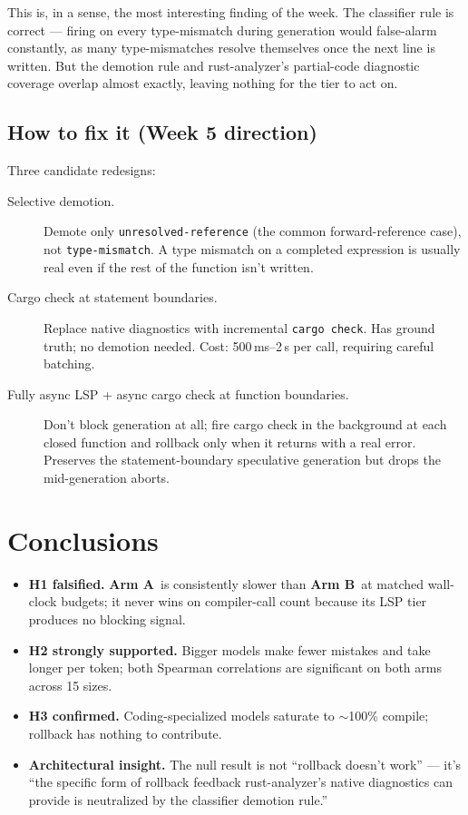 \documentclass[11pt]{article}
\newcommand{\armA}{\textbf{Arm A}}
\newcommand{\armB}{\textbf{Arm B}}
\begin{document}
This is, in a sense, the most interesting finding of the week. The classifier rule is correct --- firing on every type-mismatch during generation would false-alarm constantly, as many type-mismatches resolve themselves once the next line is written. But the demotion rule and rust-analyzer's partial-code diagnostic coverage overlap almost exactly, leaving nothing for the tier to act on.

\subsection{How to fix it (Week 5 direction)}

Three candidate redesigns:

\begin{description}
    \item[Selective demotion.] Demote only \texttt{unresolved-reference} (the common forward-reference case), not \texttt{type-mismatch}. A type mismatch on a completed expression is usually real even if the rest of the function isn't written.
    \item[Cargo check at statement boundaries.] Replace native diagnostics with incremental \texttt{cargo check}. Has ground truth; no demotion needed. Cost: 500\,ms--2\,s per call, requiring careful batching.
    \item[Fully async LSP + async cargo check at function boundaries.] Don't block generation at all; fire cargo check in the background at each closed function and rollback only when it returns with a real error. Preserves the statement-boundary speculative generation but drops the mid-generation aborts.
\end{description}

\section{Conclusions}
\label{sec:conclusions}

\begin{itemize}
    \item \textbf{H1 falsified.} \armA\ is consistently slower than \armB\ at matched wall-clock budgets; it never wins on compiler-call count because its LSP tier produces no blocking signal.
    \item \textbf{H2 strongly supported.} Bigger models make fewer mistakes and take longer per token; both Spearman correlations are significant on both arms across 15 sizes.
    \item \textbf{H3 confirmed.} Coding-specialized models saturate to $\sim$100\% compile; rollback has nothing to contribute.
    \item \textbf{Architectural insight.} The null result is not ``rollback doesn't work'' --- it's ``the specific form of rollback feedback rust-analyzer's native diagnostics can provide is neutralized by the classifier demotion rule.''
\end{itemize}
\end{document}
